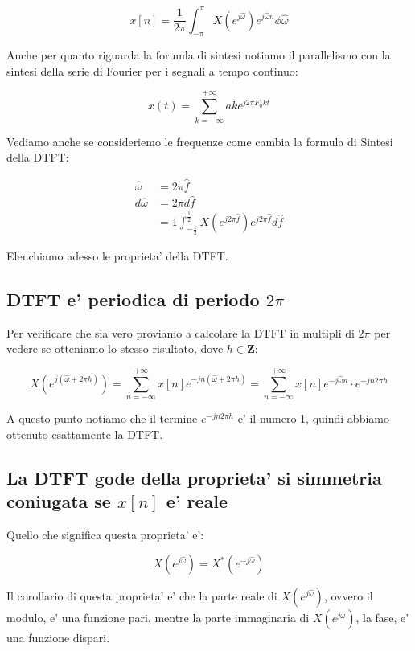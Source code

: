 \begin{equation}
    x[n] = \frac{1}{2\pi} \int_{-\pi}^{\pi} X(e^{j \hat{\omega}}) e^{j \hat{\omega} n } \phi \hat{\omega}
\end{equation}

Anche per quanto riguarda la forumla di sintesi notiamo il parallelismo con la sintesi della serie di Fourier per i segnali a tempo continuo:

\[
    x(t) = \sum_{k = - \infty}^{+ \infty} ak e ^{j 2\pi F_0 k t}
\]

Vediamo anche se consideriemo le frequenze come cambia la formula di Sintesi della DTFT:

\[\begin{split}
    \hat{\omega} &= 2\pi \hat{f} \\
    d \hat{\omega} &= 2\pi d \hat{f} \\
    &= 1 \int_{-\frac{1}{2}}^{\frac{1}{2}} X(e^{j 2\pi \hat{f}}) e^{j 2\pi \hat{f}} d \hat{f}
\end{split}\]

Elenchiamo adesso le proprieta' della DTFT.

\subsection{DTFT e' periodica di periodo $2\pi$}

Per verificare che sia vero proviamo a calcolare la DTFT in multipli di $2\pi$ per vedere se otteniamo lo stesso risultato, dove $h \in \mathbf{Z}$:

\[
    X(e^{j (\hat{\omega} + 2\pi h)}) = \sum_{n = - \infty}^{+ \infty} x[n] e^{-j n (\hat{\omega} + 2\pi h)} = \sum_{n = - \infty}^{+ \infty} x[n] e^{-j \hat{\omega} n} \cdot e^{-j n 2\pi h}
\]

A questo punto notiamo che il termine $e^{-j n 2\pi h}$ e' il numero 1, quindi abbiamo ottenuto esattamente la DTFT.

\subsection{La DTFT gode della proprieta' si simmetria coniugata se $x[n]$ e' reale}

Quello che significa questa proprieta' e':

\[
     X(e^{j \hat{\omega}}) =  X^*(e^{-j \hat{\omega}})
\]

Il corollario di questa proprieta' e' che la parte reale di $ X(e^{j \hat{\omega}})$, ovvero il modulo, e' una funzione pari, mentre la parte immaginaria di $ X(e^{j \hat{\omega}})$, la fase, e' una funzione dispari.

